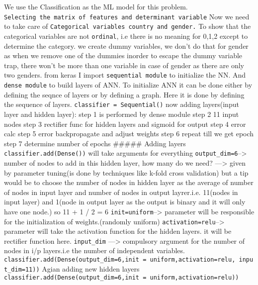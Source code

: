 \documentclass[11pt]{article}
\begin{document}
We use the Classification as the ML model for this problem.
\texttt{Selecting\ the\ matrix\ of\ features\ and\ determinant\ variable}
Now we need to take care of
\texttt{Categorical\ variables\ country\ and\ gender.} To show that the
categorical variables are not \texttt{ordinal}, i.e there is no meaning
for 0,1,2 except to determine the category. we create dummy variables,
we don't do that for gender as when we remove one of the dummies inorder
to escape the dummy variable trap, there won't be more than one variable
in case of gender as there are only two genders. from keras I import
\texttt{sequential\ module} to initialize the NN. And
\texttt{dense\ module} to build layers of ANN. To initialize ANN it can
be done either by defining the seqnce of layers or by defining a graph.
Here it is done by defining the sequence of layers.
\texttt{classifier\ =\ Sequential()} now adding layers(input layer and
hidden layer): step 1 is performed by dense module step 2 11 input nodes
step 3 rectifier func for hidden layers and sigmoid for output step 4
error calc step 5 error backpropagate and adjust weights step 6 repeat
till we get epoch step 7 determine number of epochs \#\#\#\#\# Adding
layers \texttt{classifier.add(Dense())} will take arguments for
everything \texttt{output\_dim=6}--\textgreater{} number of nodes to add
in this hidden layer, how many do we need? ---\textgreater{} given by
parameter tuning(is done by techniques like k-fold cross validation) but
a tip would be to choose the number of nodes in hidden layer as the
average of number of nodes in input layer and number of nodes in output
layrer.i.e. 11(nodes in input layer) and 1(node in output layer as the
output is binary and it will only have one node.) so 11 + 1 / 2 = 6
\texttt{init=\textquotesingle{}uniform\textquotesingle{}}--\textgreater{}
parameter will be responsible for the initialization of
weights.(randomly uniform)
\texttt{activation=\textquotesingle{}relu\textquotesingle{}}--\textgreater{}
parameter will take the activation function for the hidden layers. it
will be rectifier function here. \texttt{input\_dim} ---\textgreater{}
compulsory argument for the number of nodes in i/p layers.i.e the number
of independent variables.
\texttt{classifier.add(Dense(output\_dim=6,init\ =\ \textquotesingle{}uniform\textquotesingle{},activation=\textquotesingle{}relu\textquotesingle{},\ input\_dim=11))}
Agian adding new hidden layers
\texttt{classifier.add(Dense(output\_dim=6,init\ =\ \textquotesingle{}uniform\textquotesingle{},activation=\textquotesingle{}relu\textquotesingle{}))}
\end{document}
